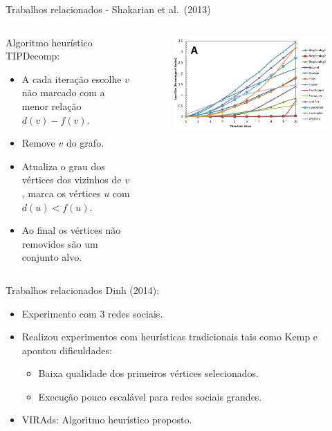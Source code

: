 \documentclass{beamer}
\begin{document}
\begin{frame}{Trabalhos relacionados - Shakarian et al.~(2013)}
\begin{columns}[T]
\begin{column}{.5\textwidth}
Algoritmo heurístico TIPDecomp:

\begin{itemize}
\tightlist
\item
  A cada iteração escolhe \(v\) não marcado com a menor
  relação \(d(v)-f(v)\).
\item
  Remove \(v\) do grafo.
\item
  Atualiza o grau dos vértices dos vizinhos de \(v\), marca os vértices
  \(u\) com \(d(u)<f(u)\).
\item
  Ao final os vértices não removidos são um conjunto alvo.
\end{itemize}

\end{column}
\begin{column}{.5\textwidth}
\centering
\begin{figure}
\centering
\includegraphics[scale=0.2]{img/shak1.png}
\end{figure}

\end{column}
\end{columns}
\end{frame}

\begin{frame}{Trabalhos relacionados}
\protect\hypertarget{trabalhos-relacionados-2}{}
Dinh (2014):

\begin{itemize}
\tightlist
\item
  Experimento com 3 redes sociais.
\item
  Realizou experimentos com heurísticas tradicionais tais como Kemp e
  apontou dificuldades:

  \begin{itemize}
  \tightlist
  \item
    Baixa qualidade dos primeiros vértices selecionados.
  \item
    Execução pouco escalável para redes sociais grandes.
  \end{itemize}
\item
  VIRAds: Algoritmo heurístico proposto.
\end{itemize}
\end{frame}
\end{document}
